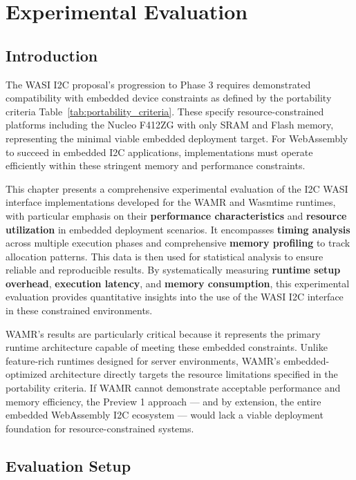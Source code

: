 \chapter{Experimental Evaluation}
\label{chap:eval}

\section{Introduction}
\label{sec:eval-intro}

The WASI I2C proposal's progression to Phase 3 requires demonstrated compatibility with embedded device constraints as defined by the portability criteria Table~\ref{tab:portability_criteria}. These specify resource-constrained platforms including the Nucleo F412ZG with only  SRAM and  Flash memory, representing the minimal viable embedded deployment target. For WebAssembly to succeed in embedded I2C applications, implementations must operate efficiently within these stringent memory and performance constraints.

This chapter presents a comprehensive experimental evaluation of the I2C WASI interface implementations developed for the WAMR and Wasmtime runtimes, with particular emphasis on their \textbf{performance characteristics} and \textbf{resource utilization} in embedded deployment scenarios. It encompasses \textbf{timing analysis} across multiple execution phases and comprehensive \textbf{memory profiling} to track allocation patterns. This data is then used for statistical analysis to ensure reliable and reproducible results. By systematically measuring \textbf{runtime setup overhead}, \textbf{execution latency}, and \textbf{memory consumption}, this experimental evaluation provides quantitative insights into the use of the WASI I2C interface in these constrained environments.

WAMR's results are particularly critical because it represents the primary runtime architecture capable of meeting these embedded constraints. Unlike feature-rich runtimes designed for server environments, WAMR's embedded-optimized architecture directly targets the resource limitations specified in the portability criteria. If WAMR cannot demonstrate acceptable performance and memory efficiency, the Preview 1 approach --- and by extension, the entire embedded WebAssembly I2C ecosystem --- would lack a viable deployment foundation for resource-constrained systems.\\

\section{Evaluation Setup}
\label{sec:eval-methodology}

